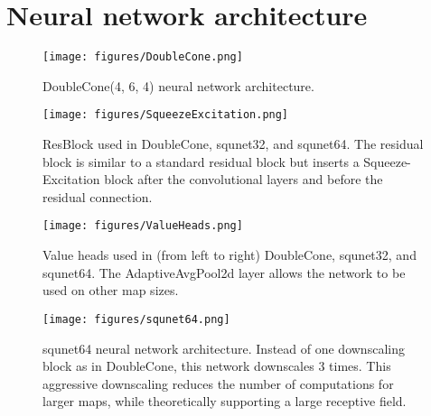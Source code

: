 \documentclass{article}
\begin{document}
\section{Neural network architecture}
\begin{figure}[H]
    \begin{center}
        \texttt{[image: figures/DoubleCone.png]}
    \end{center}
    \caption{DoubleCone(4, 6, 4) neural network architecture.}
    \label{fig:doublecone}
\end{figure}

\begin{figure}[h]
    \begin{center}
        \texttt{[image: figures/SqueezeExcitation.png]}
    \end{center}
    \caption{ResBlock used in DoubleCone, squnet32, and squnet64. The residual block is similar to a standard residual block but inserts a Squeeze-Excitation block after the convolutional layers and before the residual connection.}
    \label{fig:squeezeexcitation}
\end{figure}

\begin{figure}[h]
    \begin{center}
        \texttt{[image: figures/ValueHeads.png]}
    \end{center}
    \caption{Value heads used in (from left to right) DoubleCone, squnet32, and
    squnet64. The AdaptiveAvgPool2d layer allows the network to be used on other map
    sizes.}
    \label{fig:valueheads}
\end{figure}

\begin{figure}[H]
    \begin{center}
        \texttt{[image: figures/squnet64.png]}
    \end{center}
    \caption{squnet64 neural network architecture. Instead of one downscaling block as in DoubleCone, this network downscales 3 times. This aggressive downscaling reduces the number of computations for larger maps, while theoretically supporting a large receptive field.}
    \label{fig:squnet}
\end{figure}
        
\end{document}
